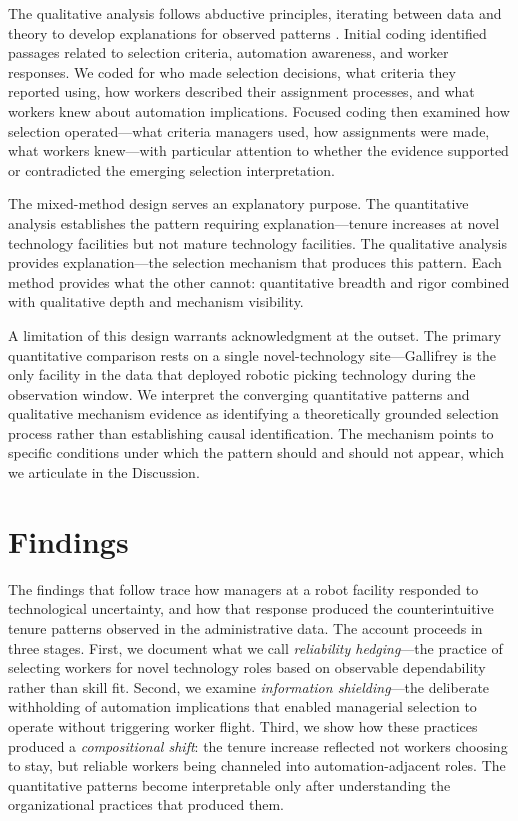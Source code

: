 \documentclass[12pt]{article}
\begin{document}
The qualitative analysis follows abductive principles, iterating between data and theory to develop explanations for observed patterns \citep{locke2007grounded}. Initial coding identified passages related to selection criteria, automation awareness, and worker responses. We coded for who made selection decisions, what criteria they reported using, how workers described their assignment processes, and what workers knew about automation implications. Focused coding then examined how selection operated---what criteria managers used, how assignments were made, what workers knew---with particular attention to whether the evidence supported or contradicted the emerging selection interpretation.

The mixed-method design serves an explanatory purpose. The quantitative analysis establishes the pattern requiring explanation---tenure increases at novel technology facilities but not mature technology facilities. The qualitative analysis provides explanation---the selection mechanism that produces this pattern. Each method provides what the other cannot: quantitative breadth and rigor combined with qualitative depth and mechanism visibility.

A limitation of this design warrants acknowledgment at the outset. The primary quantitative comparison rests on a single novel-technology site---Gallifrey is the only facility in the data that deployed robotic picking technology during the observation window. We interpret the converging quantitative patterns and qualitative mechanism evidence as identifying a theoretically grounded selection process rather than establishing causal identification. The mechanism points to specific conditions under which the pattern should and should not appear, which we articulate in the Discussion.

\section{Findings}

The findings that follow trace how managers at a robot facility responded to technological uncertainty, and how that response produced the counterintuitive tenure patterns observed in the administrative data. The account proceeds in three stages. First, we document what we call \textit{reliability hedging}---the practice of selecting workers for novel technology roles based on observable dependability rather than skill fit. Second, we examine \textit{information shielding}---the deliberate withholding of automation implications that enabled managerial selection to operate without triggering worker flight. Third, we show how these practices produced a \textit{compositional shift}: the tenure increase reflected not workers choosing to stay, but reliable workers being channeled into automation-adjacent roles. The quantitative patterns become interpretable only after understanding the organizational practices that produced them.
\end{document}
